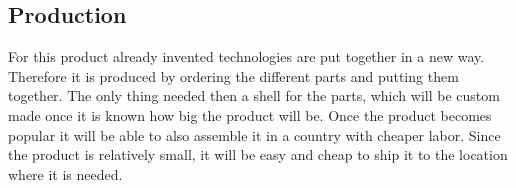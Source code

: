 \documentclass[11pt,a4paper]{article}
\begin{document}
\subsection{Production}
For this product already invented technologies are put together in a new way. Therefore it is produced by ordering the different parts and putting them together. The only thing needed then a shell for the parts, which will be custom made once it is known how big the product will be. Once the product becomes popular it will be able to also assemble it in a country with cheaper labor. Since the product is relatively small, it will be easy and cheap to ship it to the location where it is needed.
\end{document}
